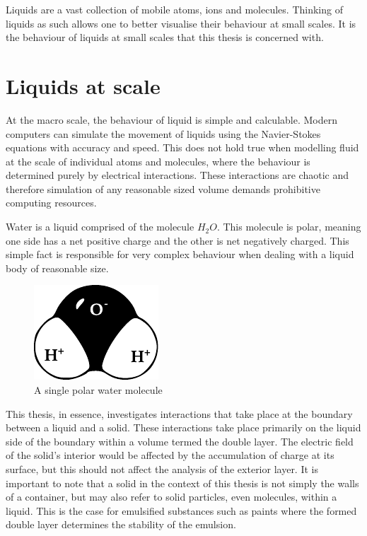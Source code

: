 
Liquids are a vast collection of mobile atoms, ions and molecules. Thinking of liquids as such allows one to better visualise their behaviour at small scales. It is the behaviour of liquids at small scales that this thesis is concerned with.

\section{Liquids at scale}
At the macro scale, the behaviour of liquid is simple and calculable. Modern computers can simulate the movement of liquids using the Navier-Stokes equations with accuracy and speed. This does not hold true when modelling fluid at the scale of individual atoms and molecules, where the behaviour is determined purely by electrical interactions. These interactions are chaotic and therefore simulation of any reasonable sized volume demands prohibitive computing resources.

Water is a liquid comprised of the molecule $H_{2}O$. This molecule is polar, meaning one side has a net positive charge and the other is net negatively charged. This simple fact is responsible for very complex behaviour when dealing with a liquid body of reasonable size.

\begin{figure}
    \begin{center}
        \includegraphics{content/introduction/graphics/polarWater}
    \end{center}
    \caption{A single polar water molecule}
    \label{fig:waterMolecule}
\end{figure}

This thesis, in essence, investigates interactions that take place at the boundary between a liquid and a solid. These interactions take place primarily on the liquid side of the boundary within a volume termed the double layer. The electric field of the solid's interior would be affected by the accumulation of charge at its surface, but this should not affect the analysis of the exterior layer. It is important to note that a solid in the context of this thesis is not simply the walls of a container, but may also refer to solid particles, even molecules, within a liquid. This is the case for emulsified substances such as paints where the formed double layer determines the stability of the emulsion.

